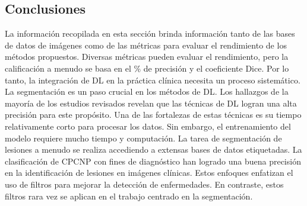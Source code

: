 \documentclass[11pt,a4paper,openany]{article}
\begin{document}
    \subsection{Conclusiones}
    La información recopilada en esta sección brinda información tanto de las bases de datos de imágenes como de las métricas para evaluar el rendimiento de los métodos propuestos. Diversas métricas pueden evaluar el rendimiento, pero la calificación a menudo se basa en el \%  de precisión y el coeficiente Dice. Por lo tanto, la integración de DL en la práctica clínica necesita un proceso sistemático.\\

    La segmentación es un paso crucial en los métodos de DL. Los hallazgos de la mayoría de los estudios revisados revelan que las técnicas de DL logran una alta precisión para este propósito. Una de las fortalezas de estas técnicas es su tiempo relativamente corto para procesar los datos. Sin embargo, el entrenamiento del modelo requiere mucho tiempo y computación. La tarea de segmentación de lesiones a menudo se realiza accediendo a extensas bases de datos etiquetadas. La clasificación de CPCNP con fines de diagnóstico han logrado una buena precisión en la identificación de lesiones en imágenes clínicas. Estos enfoques enfatizan el uso de filtros para mejorar la detección de enfermedades. En contraste, estos filtros rara vez se aplican en el trabajo centrado en la segmentación. \\
\end{document}
